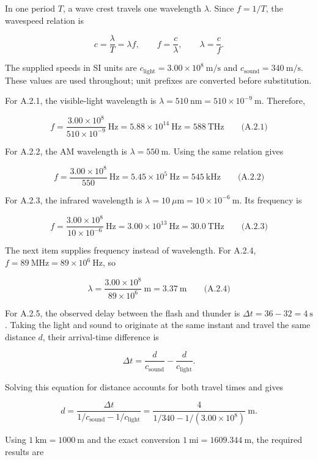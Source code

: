 In one period \(T\), a wave crest travels one wavelength \(\lambda\). Since \(f=1/T\), the wavespeed relation is

\[c=\frac{\lambda}{T}=\lambda f,\qquad f=\frac{c}{\lambda},\qquad \lambda=\frac{c}{f}.\]

The supplied speeds in SI units are \(c_{\mathrm{light}}=3.00\times10^8\ \mathrm{m/s}\) and \(c_{\mathrm{sound}}=340\ \mathrm{m/s}\). These values are used throughout; unit prefixes are converted before substitution.

For A.2.1, the visible-light wavelength is \(\lambda=510\ \mathrm{nm}=510\times10^{-9}\ \mathrm{m}\). Therefore,

\[\boxed{f=\frac{3.00\times10^8}{510\times10^{-9}}\ \mathrm{Hz}=5.88\times10^{14}\ \mathrm{Hz}=588\ \mathrm{THz}}\qquad\text{(A.2.1)}\]

For A.2.2, the AM wavelength is \(\lambda=550\ \mathrm{m}\). Using the same relation gives

\[\boxed{f=\frac{3.00\times10^8}{550}\ \mathrm{Hz}=5.45\times10^5\ \mathrm{Hz}=545\ \mathrm{kHz}}\qquad\text{(A.2.2)}\]

For A.2.3, the infrared wavelength is \(\lambda=10\ \mu\mathrm{m}=10\times10^{-6}\ \mathrm{m}\). Its frequency is

\[\boxed{f=\frac{3.00\times10^8}{10\times10^{-6}}\ \mathrm{Hz}=3.00\times10^{13}\ \mathrm{Hz}=30.0\ \mathrm{THz}}\qquad\text{(A.2.3)}\]

The next item supplies frequency instead of wavelength. For A.2.4, \(f=89\ \mathrm{MHz}=89\times10^6\ \mathrm{Hz}\), so

\[\boxed{\lambda=\frac{3.00\times10^8}{89\times10^6}\ \mathrm{m}=3.37\ \mathrm{m}}\qquad\text{(A.2.4)}\]

For A.2.5, the observed delay between the flash and thunder is \(\Delta t=36-32=4\ \mathrm{s}\). Taking the light and sound to originate at the same instant and travel the same distance \(d\), their arrival-time difference is

\[\Delta t=\frac{d}{c_{\mathrm{sound}}}-\frac{d}{c_{\mathrm{light}}}.\]

Solving this equation for distance accounts for both travel times and gives

\[d=\frac{\Delta t}{1/c_{\mathrm{sound}}-1/c_{\mathrm{light}}}
=\frac{4}{1/340-1/(3.00\times10^8)}\ \mathrm{m}.\]

Using \(1\ \mathrm{km}=1000\ \mathrm{m}\) and the exact conversion \(1\ \mathrm{mi}=1609.344\ \mathrm{m}\), the required results are

